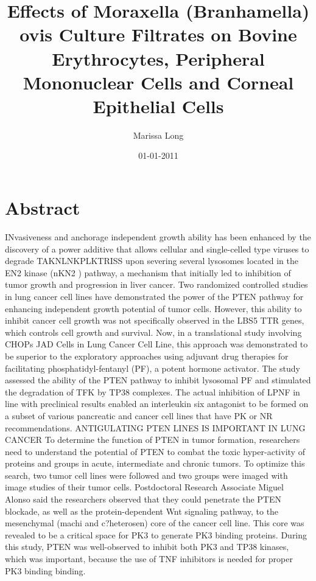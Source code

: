 \documentclass{article}%
\title{Effects of Moraxella (Branhamella) ovis Culture Filtrates on Bovine Erythrocytes, Peripheral Mononuclear Cells and Corneal Epithelial Cells}%
\author{Marissa Long}%
\affil{Second Department of Internal Medicine, Tottori University School of Medicine, Tottori 683{-}8504, Japan}%
\date{01{-}01{-}2011}%
\begin{document}
%
\normalsize%
\maketitle%
\section{Abstract}%
\label{sec:Abstract}%
INvasiveness and anchorage independent growth ability has been enhanced by the discovery of a power additive that allows cellular and single{-}celled type viruses to degrade TAKNLNKPLKTRISS upon severing several lysosomes located in the EN2 kinase (nKN2 ) pathway, a mechanism that initially led to inhibition of tumor growth and progression in liver cancer.\newline%
Two randomized controlled studies in lung cancer cell lines have demonstrated the power of the PTEN pathway for enhancing independent growth potential of tumor cells. However, this ability to inhibit cancer cell growth was not specifically observed in the LBS5 TTR genes, which controls cell growth and survival.\newline%
Now, in a translational study involving CHOPs JAD Cells in Lung Cancer Cell Line, this approach was demonstrated to be superior to the exploratory approaches using adjuvant drug therapies for facilitating phosphatidyl{-}fentanyl (PF), a potent hormone activator. The study assessed the ability of the PTEN pathway to inhibit lysosomal PF and stimulated the degradation of TFK by TP38 complexes. The actual inhibition of LPNF in line with preclinical results enabled an interleukin six antagonist to be formed on a subset of various pancreatic and cancer cell lines that have PK or NR recommendations.\newline%
ANTIGULATING PTEN LINES IS IMPORTANT IN LUNG CANCER To determine the function of PTEN in tumor formation, researchers need to understand the potential of PTEN to combat the toxic hyper{-}activity of proteins and groups in acute, intermediate and chronic tumors. To optimize this search, two tumor cell lines were followed and two groups were imaged with image studies of their tumor cells.\newline%
Postdoctoral Research Associate Miguel Alonso said the researchers observed that they could penetrate the PTEN blockade, as well as the protein{-}dependent Wnt signaling pathway, to the mesenchymal (machi and c?heterosen) core of the cancer cell line. This core was revealed to be a critical space for PK3 to generate PK3 binding proteins. During this study, PTEN was well{-}observed to inhibit both PK3 and TP38 kinases, which was important, because the use of TNF inhibitors is needed for proper PK3 binding binding.\newline%
\end{document}
